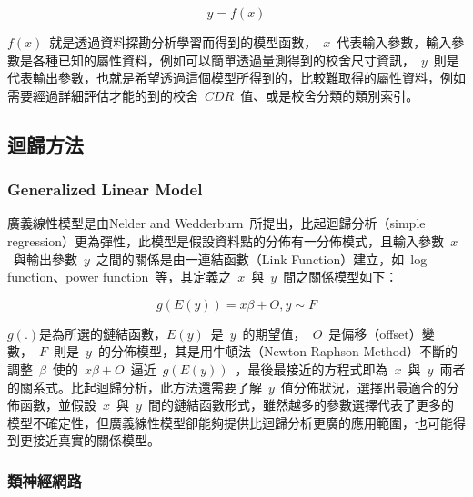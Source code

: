 \begin{equation} y = f(x) \label{eq:ModelEqu}\end{equation} 

$f(x)$~就是透過資料探勘分析學習而得到的模型函數，~$x$~代表輸入參數，輸入參數是各種已知的屬性資料，例如可以簡單透過量測得到的校舍尺寸資訊，~$y$~則是代表輸出參數，也就是希望透過這個模型所得到的，比較難取得的屬性資料，例如需要經過詳細評估才能的到的校舍~$CDR$~值、或是校舍分類的類別索引。

\subsection{迴歸方法}

\subsubsection{Generalized Linear Model}

廣義線性模型是由Nelder and Wedderburn~\cite{citeulike:5485398}所提出，比起迴歸分析（simple regression）更為彈性，此模型是假設資料點的分佈有一分佈模式，且輸入參數~$x$~與輸出參數~$y$~之間的關係是由一連結函數（Link Function）建立，如~log function、power function~等，其定義之~$x$~與~$y$~間之關係模型如下：


\begin{equation} g(E(y)) = x\beta + O, y \sim F \label{eq:GLM}\end{equation} 

$g(.)$是為所選的鏈結函數，$E(y)$~是~$y$~的期望值，~$O$~是偏移（offset）變數，~$F$~則是~$y$~的分佈模型，其是用牛頓法（Newton-Raphson Method）不斷的調整~$\beta$~使的~$x\beta + O$~逼近~$g(E(y))$~，最後最接近的方程式即為~$x$~與~$y$~兩者的關系式。比起迴歸分析，此方法還需要了解~$y$~值分佈狀況，選擇出最適合的分佈函數，並假設~$x$~與~$y$~間的鏈結函數形式，雖然越多的參數選擇代表了更多的模型不確定性，但廣義線性模型卻能夠提供比迴歸分析更廣的應用範圍，也可能得到更接近真實的關係模型。


\subsubsection{類神經網路}

